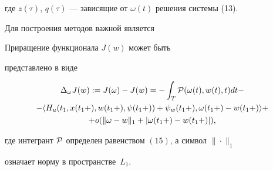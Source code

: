 где $z(\tau)$, $q(\tau)$ --- зависящие от $\omega(t)$ решения системы (13).





Для построения методов важной является





\begin{thm}


Приращение функционала $J(w)$ может быть


представлено в виде


\begin{multline}


\Delta_\omega J(w):=J(\omega)-J(w)=-\int_T{\cal P}(\omega(t),w(t),t)dt-\\


-\langle H_u(t_1,x(t_1+),w(t_1+),


\psi(t_1+))+\psi_w(t_1+),\omega(t_1+)-w(t_1+)\rangle + \\


+ o(\| \omega - w\|_1 +|\omega(t_1+)-w(t_1+)|),


\end{multline}


где интегрант ${\cal P}$ определен равенством $(15)$, а символ $\|\cdot\|_1$


означает норму в пространстве~$L_1$.


\end{thm}





